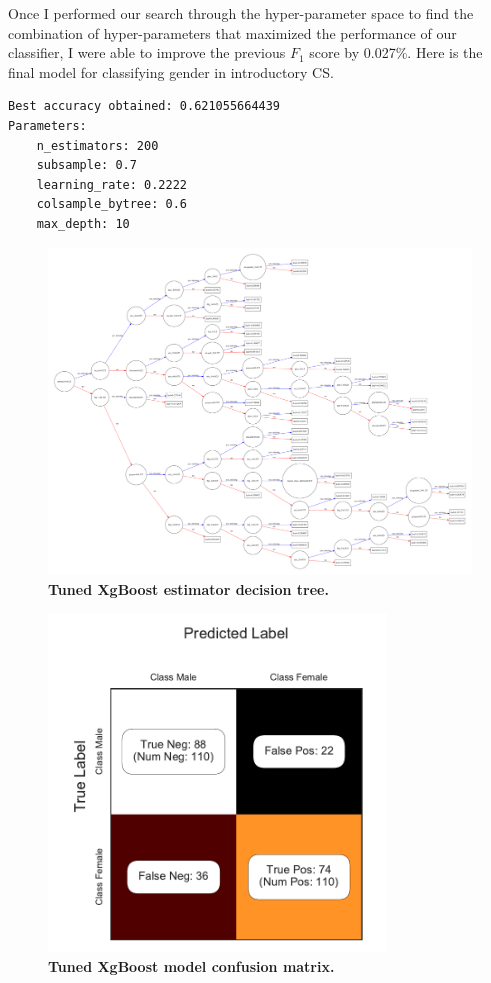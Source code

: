 Once I performed our search through the hyper-parameter space to find the combination of hyper-parameters that maximized the performance of our classifier, I were able to improve the previous $F_1$ score by 0.027\%. Here is the final model for classifying gender in introductory CS. 
\begin{verbatim}
Best accuracy obtained: 0.621055664439
Parameters:
    n_estimators: 200
    subsample: 0.7
    learning_rate: 0.2222
    colsample_bytree: 0.6
    max_depth: 10

\end{verbatim}

\begin{figure}[!hbtp]
\centering
    \includegraphics[width=1\textwidth]{figures/Tuned_model_graph}
    \caption{\textbf{Tuned XgBoost estimator decision tree. }\textit{}}\label{tuned_plot_tree}
\end{figure}

\begin{figure}[!hbtp]
\centering
    \includegraphics[width=0.8\textwidth]{figures/tuned_model_CM}
    \caption{\textbf{Tuned XgBoost model confusion matrix. }\textit{}}\label{tuned_CM}
\end{figure}

